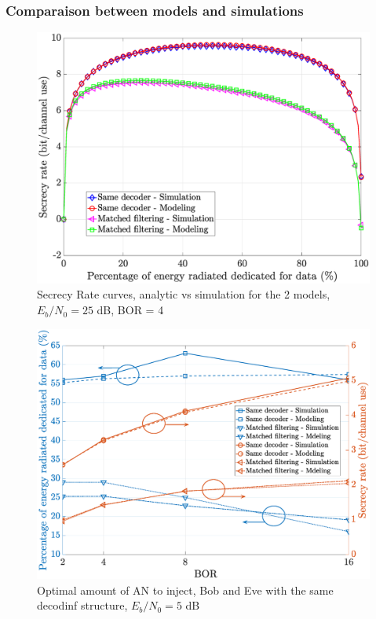 \subsubsection{Comparaison between models and simulations}
\label{subsubsec:sec_result_despreading}
\begin{figure}[ht!]
    \centering
    \centerline{\includegraphics[width = .65\textwidth]{graphs/SR_simu_anal_comparaison.eps}}
    \caption{Secrecy Rate curves, analytic vs simulation for the 2 models, $E_b/N_0=25$ dB, BOR = 4 }
    \label{fig:secrecy_alpha_bor}
\end{figure}
\begin{figure}[ht!]
    \centering
    \centerline{\includegraphics[width = .65\textwidth]{graphs/SR_max2.eps}}
    \caption{Optimal amount of AN to inject, Bob and Eve with the same decodinf structure, $E_b/N_0=5$ dB }
    \label{fig:secrecy_alpha_bor_optimal}
\end{figure}

